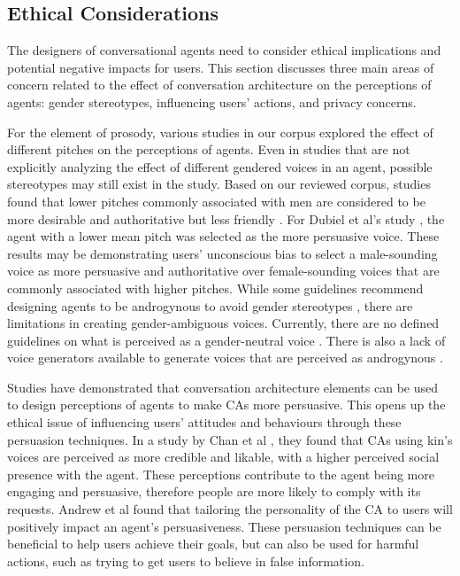 \subsection{Ethical Considerations}

The designers of conversational agents need to consider ethical implications and potential negative impacts for users. This section discusses three main areas of concern related to the effect of conversation architecture on the perceptions of agents: gender stereotypes, influencing users' actions, and privacy concerns.

For the element of prosody, various studies in our corpus explored the effect of different pitches on the perceptions of agents. Even in studies that are not explicitly analyzing the effect of different gendered voices in an agent, possible stereotypes may still exist in the study. Based on our reviewed corpus, studies found that lower pitches commonly associated with men are considered to be more desirable and authoritative but less friendly \cite{jestin2022effects, tolmeijer2021female}\cmt{[81][62]}. For Dubiel et al's study \cite{dubiel2020persuasive}\cmt{[60]}, the agent with a lower mean pitch was selected as the more persuasive voice. These results may be demonstrating users' unconscious bias to select a male-sounding voice as more persuasive and authoritative over female-sounding voices that are commonly associated with higher pitches. While some guidelines recommend designing agents to be androgynous to avoid gender stereotypes \cite{ruane2019conversational}, there are limitations in creating gender-ambiguous voices. Currently, there are no defined guidelines on what is perceived as a gender-neutral voice \cite{jestin2022effects}\cmt{[81]}. There is also a lack of voice generators available to generate voices that are perceived as androgynous \cite{tolmeijer2021female}\cmt{[62]}.

Studies have demonstrated that conversation architecture elements can be used to design perceptions of agents to make CAs more persuasive. This opens up the ethical issue of influencing users' attitudes and behaviours through these persuasion techniques. In a study by Chan et al \cite{chan2021kinvoices}\cmt{[74]}, they found that CAs using kin's voices are perceived as more credible and likable, with a higher perceived social presence with the agent. These perceptions contribute to the agent being more engaging and persuasive, therefore people are more likely to comply with its requests. Andrew et al \cite{andrews2012system}\cmt{[38]} found that tailoring the personality of the CA to users will positively impact an agent's persuasiveness. These persuasion techniques can be beneficial to help users achieve their goals, but can also be used for harmful actions, such as trying to get users to believe in false information.

